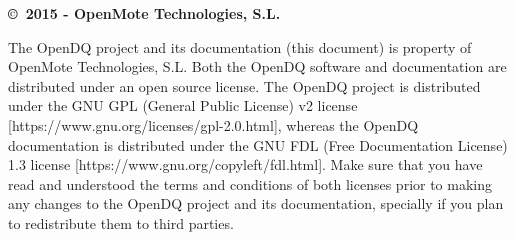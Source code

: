 \vspace*{8cm}
\begin{center}
\textbf{\copyright\ 2015 - OpenMote Technologies, S.L.} \\
\end{center}
The OpenDQ project and its documentation (this document) is property of OpenMote Technologies, S.L. Both the OpenDQ software and documentation are distributed under an open source license. The OpenDQ project is distributed under the GNU GPL (General Public License) v2 license [https://www.gnu.org/licenses/gpl-2.0.html], whereas the OpenDQ documentation is distributed under the GNU  FDL (Free Documentation License) 1.3 license [https://www.gnu.org/copyleft/fdl.html]. Make sure that you have read and understood the terms and conditions of both licenses prior to making any changes to the OpenDQ project and its documentation, specially if you plan to redistribute them to third parties.
